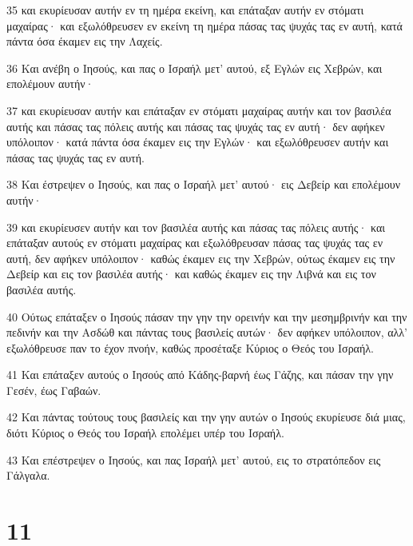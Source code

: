 \par 35 και εκυρίευσαν αυτήν εν τη ημέρα εκείνη, και επάταξαν αυτήν εν στόματι μαχαίρας· και εξωλόθρευσεν εν εκείνη τη ημέρα πάσας τας ψυχάς τας εν αυτή, κατά πάντα όσα έκαμεν εις την Λαχείς.
\par 36 Και ανέβη ο Ιησούς, και πας ο Ισραήλ μετ' αυτού, εξ Εγλών εις Χεβρών, και επολέμουν αυτήν·
\par 37 και εκυρίευσαν αυτήν και επάταξαν εν στόματι μαχαίρας αυτήν και τον βασιλέα αυτής και πάσας τας πόλεις αυτής και πάσας τας ψυχάς τας εν αυτή· δεν αφήκεν υπόλοιπον· κατά πάντα όσα έκαμεν εις την Εγλών· και εξωλόθρευσεν αυτήν και πάσας τας ψυχάς τας εν αυτή.
\par 38 Και έστρεψεν ο Ιησούς, και πας ο Ισραήλ μετ' αυτού· εις Δεβείρ και επολέμουν αυτήν·
\par 39 και εκυρίευσεν αυτήν και τον βασιλέα αυτής και πάσας τας πόλεις αυτής· και επάταξαν αυτούς εν στόματι μαχαίρας και εξωλόθρευσαν πάσας τας ψυχάς τας εν αυτή, δεν αφήκεν υπόλοιπον· καθώς έκαμεν εις την Χεβρών, ούτως έκαμεν εις την Δεβείρ και εις τον βασιλέα αυτής· και καθώς έκαμεν εις την Λιβνά και εις τον βασιλέα αυτής.
\par 40 Ούτως επάταξεν ο Ιησούς πάσαν την γην την ορεινήν και την μεσημβρινήν και την πεδινήν και την Ασδώθ και πάντας τους βασιλείς αυτών· δεν αφήκεν υπόλοιπον, αλλ' εξωλόθρευσε παν το έχον πνοήν, καθώς προσέταξε Κύριος ο Θεός του Ισραήλ.
\par 41 Και επάταξεν αυτούς ο Ιησούς από Κάδης-βαρνή έως Γάζης, και πάσαν την γην Γεσέν, έως Γαβαών.
\par 42 Και πάντας τούτους τους βασιλείς και την γην αυτών ο Ιησούς εκυρίευσε διά μιας, διότι Κύριος ο Θεός του Ισραήλ επολέμει υπέρ του Ισραήλ.
\par 43 Και επέστρεψεν ο Ιησούς, και πας Ισραήλ μετ' αυτού, εις το στρατόπεδον εις Γάλγαλα.

\chapter{11}

